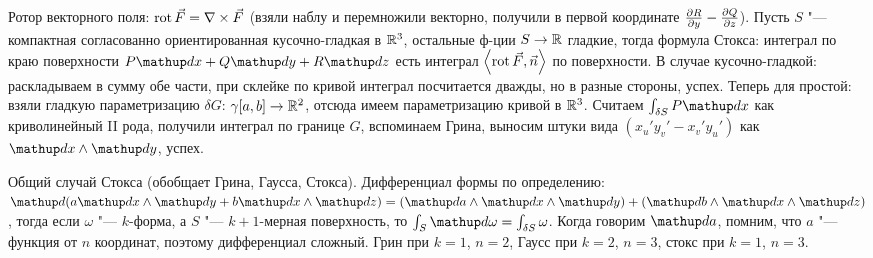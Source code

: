 \section{} %
Ротор векторного поля: $\operatorname{rot} \vec F = \nabla \times \vec F$ (взяли наблу и перемножили векторно, получили в первой координате $\frac{\partial R}{\partial y} - \frac{\partial Q}{\partial z}$).
Пусть $S$ "--- компактная согласованно ориентированная кусочно-гладкая в $\mathbb{R}^3$, остальные ф-ции $S \to \mathbb{R}$ гладкие, тогда формула Стокса:
интеграл по краю поверхности $P\d x + Q\d y + R\d z$ есть интеграл $\left<\operatorname{rot} \vec F, \vec n\right>$ по поверхности.
В случае кусочно-гладкой: раскладываем в сумму обе части, при склейке по кривой интеграл посчитается дважды, но в разные стороны, успех.
Теперь для простой: взяли гладкую параметризацию $\delta G$: $\gamma [a,b] \to \mathbb{R}^2$, отсюда имеем параметризацию кривой в $\mathbb{R}^3$.
Считаем $\int_{\delta S} P\d x$ как криволинейный II рода, получили интеграл по границе $G$, вспоминаем Грина,
выносим штуки вида $(x_u'y_v'-x_v'y_u')$ как $\d x \wedge \d y$, успех.

Общий случай Стокса (обобщает Грина, Гаусса, Стокса).
Дифференциал формы по определению: $\d(a\d x \wedge \d y + b\d x \wedge \d z) = (\d a \wedge \d x \wedge \d y) + (\d b \wedge \d x \wedge \d z)$, тогда
если $\omega$ "--- $k$-форма, а $S$ "--- $k+1$-мерная поверхность, то $\int_S \d \omega = \int_{\delta S} \omega$.
Когда говорим $\d a$, помним, что $a$ "--- функция от $n$ координат, поэтому дифференциал сложный.
Грин при $k=1$, $n=2$, Гаусс при $k=2$, $n=3$, стокс при $k=1$, $n=3$.
